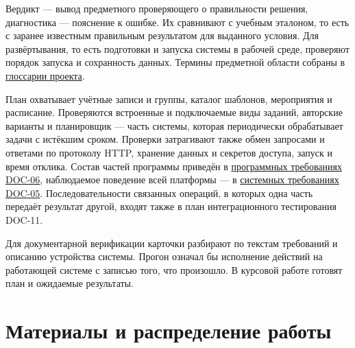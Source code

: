 \documentclass[12pt,a4paper]{article}
\begin{document}
Вердикт --- вывод предметного проверяющего о правильности решения, диагностика --- пояснение к ошибке. Их сравнивают с учебным эталоном, то есть с заранее известным правильным результатом для выданного условия. Для развёртывания, то есть подготовки и запуска системы в рабочей среде, проверяют порядок запуска и сохранность данных. Термины предметной области собраны в {\href{../notes/methodology/Глоссарий.pdf\#глоссарий}{глоссарии проекта}}.

План охватывает учётные записи и группы, каталог шаблонов, мероприятия и расписание. Проверяются встроенные и подключаемые виды заданий, авторские варианты и планировщик --- часть системы, которая периодически обрабатывает задачи с истёкшим сроком. Проверки затрагивают также обмен запросами и ответами по протоколу HTTP, хранение данных и секретов доступа, запуск и время отклика. Состав частей программы приведён в {\href{../07\_Программные\_требования/DOC-06\_Программные\_требования.pdf\#doc-06-сводные-программные-требования}{программных требованиях DOC-06}}, наблюдаемое поведение всей платформы --- в {\href{../04\_Системные\_требования/DOC-05\_Системные\_требования.pdf\#doc-05-системные-требования}{системных требованиях DOC-05}}. Последовательности связанных операций, в которых одна часть передаёт результат другой, входят также в план интеграционного тестирования DOC-11.

Для документарной верификации карточки разбирают по текстам требований и описанию устройства системы. Прогон означал бы исполнение действий на работающей системе с записью того, что произошло. В курсовой работе готовят план и ожидаемые результаты.

\section{Материалы и распределение работы}\label{ux43cux430ux442ux435ux440ux438ux430ux43bux44b-ux438-ux440ux430ux441ux43fux440ux435ux434ux435ux43bux435ux43dux438ux435-ux440ux430ux431ux43eux442ux44b}

\hypertarget{материалы-и-распределение-работы}{}
\end{document}
